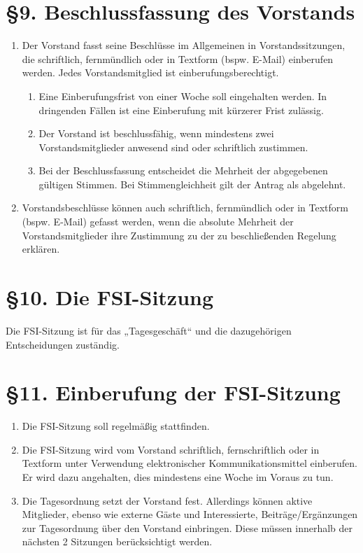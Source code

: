 \documentclass[12pt]{article}
\begin{document}
\section*{§9. Beschlussfassung des Vorstands}

\begin{enumerate}
    	\item
		Der Vorstand fasst seine Beschlüsse im Allgemeinen in
		Vorstandssitzungen, die schriftlich, fernmündlich oder in
		Textform (bspw. E-Mail) einberufen werden. Jedes
		Vorstandsmitglied ist einberufungsberechtigt.
    		\begin{enumerate}[label=(\roman*)]
			\item
				Eine Einberufungsfrist von einer Woche soll
				eingehalten werden. In dringenden Fällen ist
				eine Einberufung mit kürzerer Frist zulässig.
			\item
				Der Vorstand ist beschlussfähig, wenn
				mindestens zwei Vorstandsmitglieder anwesend
				sind oder schriftlich zustimmen.
			\item
				Bei der Beschlussfassung entscheidet die
				Mehrheit der abgegebenen gültigen Stimmen. Bei
				Stimmengleichheit gilt der Antrag als abgelehnt.
    		\end{enumerate}
	\item
		Vorstandsbeschlüsse können auch schriftlich, fernmündlich oder
		in Textform (bspw. E-Mail) gefasst werden, wenn die absolute
		Mehrheit der Vorstandsmitglieder ihre Zustimmung zu der zu
		beschließenden Regelung erklären.
\end{enumerate}


\section*{§10. Die FSI-Sitzung}

	Die FSI-Sitzung ist für das „Tagesgeschäft“ und die
	dazugehörigen Entscheidungen zuständig.


\section*{§11. Einberufung der FSI-Sitzung}

\begin{enumerate}
    	\item
		Die FSI-Sitzung soll regelmäßig stattfinden.
    	\item
		Die FSI-Sitzung wird vom Vorstand schriftlich, fernschriftlich
		oder in Textform unter Verwendung elektronischer
		Kommunikationsmittel einberufen. Er wird dazu angehalten, dies
		mindestens eine Woche im Voraus zu tun.
    	\item
		Die Tagesordnung setzt der Vorstand fest. Allerdings können
		aktive Mitglieder, ebenso wie externe Gäste und Interessierte,
		Beiträge/Ergänzungen zur Tagesordnung über den Vorstand
		einbringen. Diese müssen innerhalb der nächsten 2 Sitzungen
		berücksichtigt werden.
\end{enumerate}
\end{document}
